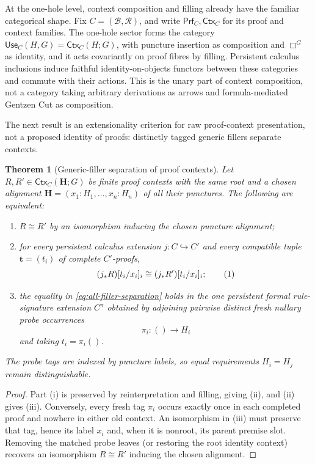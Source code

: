 \documentclass[10pt,a4paper]{article}
\theoremstyle{plain}
\newtheorem{theorem}{Theorem}[section]
\theoremstyle{definition}
\theoremstyle{remark}
\newcommand{\Base}{\mathcal B}
\newcommand{\Rules}{\mathcal R}
\newcommand{\Ctx}{\mathsf{Ctx}}
\newcommand{\Prf}{\mathsf{Prf}}
\newcommand{\eqtag}{\refstepcounter{equation}\tag{\theequation}}
\begin{document}
At the one-hole level, context composition and filling already have the
familiar categorical shape.  Fix \(C=(\Base,\Rules)\), and write
\(\Prf_C,\Ctx_C\) for its proof and context families.  The one-hole sector
forms the category
\(\mathsf{Use}_C(H,G)=\Ctx_C(H;G)\), with puncture insertion as
composition and \(\Box^G\) as identity, and it acts covariantly on proof
fibres by filling.  Persistent calculus inclusions induce faithful
identity-on-objects functors between these categories and commute with
their actions.  This is the unary part of context composition, not a
category taking arbitrary derivations as arrows and formula-mediated
Gentzen Cut as composition.

The next result is an extensionality criterion for raw proof-context
presentation, not a proposed identity of proofs: distinctly tagged generic
fillers separate contexts.

\begin{theorem}[Generic-filler separation of proof contexts]
\label{thm:generic-filler-separation}
Let \(R,R'\in\Ctx_C(\mathbf H;G)\) be finite proof contexts with the
same root and a chosen alignment
\(\mathbf H=(x_1:H_1,\ldots,x_n:H_n)\) of all their punctures.  The
following are equivalent:
\begin{enumerate}[label=(\roman*)]
\item \(R\cong R'\) by an isomorphism inducing the chosen puncture
alignment;
\item for every persistent calculus extension
\(j:C\hookrightarrow C'\) and every compatible tuple
\(\mathbf t=(t_i)\) of complete \(C'\)-proofs,
\[
       (j_*R)[t_i/x_i]_i\cong(j_*R')[t_i/x_i]_i;
\eqtag\label{eq:all-filler-separation}
\]
\item the equality in \eqref{eq:all-filler-separation} holds in the one
persistent formal rule-signature extension \(C^\pi\) obtained by adjoining
pairwise distinct fresh nullary probe occurrences
\[
                  \pi_i:()\longrightarrow H_i
\]
and taking \(t_i=\pi_i()\).
\end{enumerate}
The probe tags are indexed by puncture labels, so equal requirements
\(H_i=H_j\) remain distinguishable.
\end{theorem}

\begin{proof}
Part (i) is preserved by reinterpretation and filling, giving (ii), and
(ii) gives (iii).  Conversely, every fresh tag \(\pi_i\) occurs exactly
once in each completed proof and nowhere in either old context.  An
isomorphism in (iii) must preserve that tag, hence its label \(x_i\) and,
when it is nonroot, its parent premise slot.  Removing the matched probe
leaves (or restoring the root identity context) recovers an isomorphism
\(R\cong R'\) inducing the chosen alignment.
\end{proof}
\end{document}
